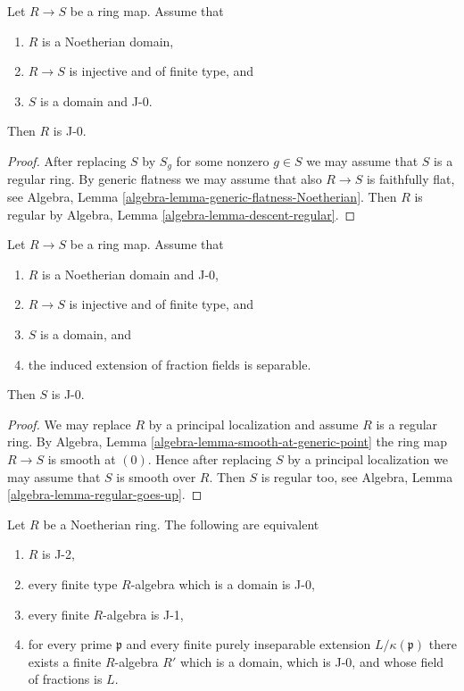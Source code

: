 \begin{lemma}
\label{lemma-J-0-goes-down}
Let $R \to S$ be a ring map. Assume that
\begin{enumerate}
\item $R$ is a Noetherian domain,
\item $R \to S$ is injective and of finite type, and
\item $S$ is a domain and J-0.
\end{enumerate}
Then $R$ is J-0.
\end{lemma}

\begin{proof}
After replacing $S$ by $S_g$ for some nonzero $g \in S$ we may assume
that $S$ is a regular ring. By generic flatness we may assume that also
$R \to S$ is faithfully flat, see
Algebra, Lemma \ref{algebra-lemma-generic-flatness-Noetherian}.
Then $R$ is regular by
Algebra, Lemma \ref{algebra-lemma-descent-regular}.
\end{proof}

\begin{lemma}
\label{lemma-J-0-goes-up}
Let $R \to S$ be a ring map. Assume that
\begin{enumerate}
\item $R$ is a Noetherian domain and J-0,
\item $R \to S$ is injective and of finite type, and
\item $S$ is a domain, and
\item the induced extension of fraction fields is separable.
\end{enumerate}
Then $S$ is J-0.
\end{lemma}

\begin{proof}
We may replace $R$ by a principal localization and assume $R$ is
a regular ring. By Algebra, Lemma \ref{algebra-lemma-smooth-at-generic-point}
the ring map $R \to S$ is smooth at $(0)$.
Hence after replacing $S$ by a principal localization
we may assume that $S$ is smooth over $R$.
Then $S$ is regular too, see
Algebra, Lemma \ref{algebra-lemma-regular-goes-up}.
\end{proof}

\begin{lemma}
\label{lemma-J-2}
Let $R$ be a Noetherian ring. The following are equivalent
\begin{enumerate}
\item $R$ is J-2,
\item every finite type $R$-algebra which is a domain is J-0,
\item every finite $R$-algebra is J-1,
\item for every prime $\mathfrak p$ and every finite purely inseparable
extension $L/\kappa(\mathfrak p)$ there exists a finite
$R$-algebra $R'$ which is a domain, which is J-0, and whose field
of fractions is $L$.
\end{enumerate}
\end{lemma}

